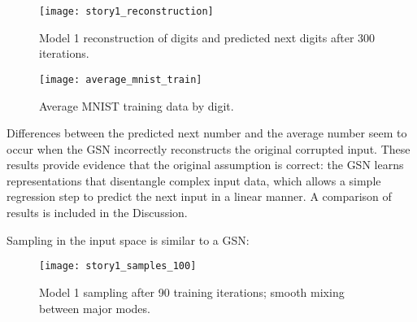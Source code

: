 \begin{figure}[h!]
  \centering
    \texttt{[image: story1\_reconstruction]}
\caption{Model 1 reconstruction of digits and predicted next digits after 300 iterations.}
\end{figure}

\begin{figure}[h!]
  \centering
    \texttt{[image: average\_mnist\_train]}
\caption{Average MNIST training data by digit.}
\end{figure}

Differences between the predicted next number and the average number seem to occur when the GSN incorrectly reconstructs the original corrupted input. These results provide evidence that the original assumption is correct: the GSN learns representations that disentangle complex input data, which allows a simple regression step to predict the next input in a linear manner. A comparison of results is included in the Discussion.

Sampling in the input space is similar to a GSN:
\begin{figure}[h!]
  \centering
    \texttt{[image: story1\_samples\_100]}
\caption{Model 1 sampling after 90 training iterations; smooth mixing between major modes.}
\end{figure}
